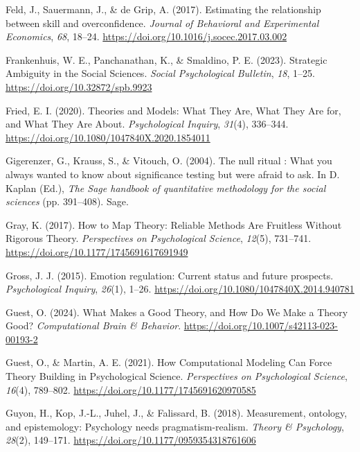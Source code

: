\documentclass[man]{apa7}
\newlength{\cslhangindent}
\newenvironment{CSLReferences}[2] %
 {\begin{list}{}{%
  \setlength{\itemindent}{0pt}
  \setlength{\leftmargin}{0pt}
  \setlength{\parsep}{0pt}
  \ifodd #1
   \setlength{\leftmargin}{\cslhangindent}
   \setlength{\itemindent}{-1\cslhangindent}
  \fi
  \setlength{\itemsep}{#2\baselineskip}}}
 {\end{list}}
\begin{document}
\begin{CSLReferences}{1}{0}
Feld, J., Sauermann, J., \& de Grip, A. (2017). Estimating the relationship between skill and overconfidence. \emph{Journal of Behavioral and Experimental Economics}, \emph{68}, 18--24. \url{https://doi.org/10.1016/j.socec.2017.03.002}

Frankenhuis, W. E., Panchanathan, K., \& Smaldino, P. E. (2023). Strategic {Ambiguity} in the {Social Sciences}. \emph{Social Psychological Bulletin}, \emph{18}, 1--25. \url{https://doi.org/10.32872/spb.9923}

Fried, E. I. (2020). Theories and {Models}: {What They Are}, {What They Are} for, and {What They Are About}. \emph{Psychological Inquiry}, \emph{31}(4), 336--344. \url{https://doi.org/10.1080/1047840X.2020.1854011}

Gigerenzer, G., Krauss, S., \& Vitouch, O. (2004). The null ritual : {What} you always wanted to know about significance testing but were afraid to ask. In D. Kaplan (Ed.), \emph{The {Sage} handbook of quantitative methodology for the social sciences} (pp. 391--408). Sage.

Gray, K. (2017). How to {Map Theory}: {Reliable Methods Are Fruitless Without Rigorous Theory}. \emph{Perspectives on Psychological Science}, \emph{12}(5), 731--741. \url{https://doi.org/10.1177/1745691617691949}

Gross, J. J. (2015). Emotion regulation: {Current} status and future prospects. \emph{Psychological Inquiry}, \emph{26}(1), 1--26. \url{https://doi.org/10.1080/1047840X.2014.940781}

Guest, O. (2024). What {Makes} a {Good Theory}, and {How Do We Make} a {Theory Good}? \emph{Computational Brain \& Behavior}. \url{https://doi.org/10.1007/s42113-023-00193-2}

Guest, O., \& Martin, A. E. (2021). How {Computational Modeling Can Force Theory Building} in {Psychological Science}. \emph{Perspectives on Psychological Science}, \emph{16}(4), 789--802. \url{https://doi.org/10.1177/1745691620970585}

Guyon, H., Kop, J.-L., Juhel, J., \& Falissard, B. (2018). Measurement, ontology, and epistemology: {Psychology} needs pragmatism-realism. \emph{Theory \& Psychology}, \emph{28}(2), 149--171. \url{https://doi.org/10.1177/0959354318761606}


\end{CSLReferences}
\end{document}

